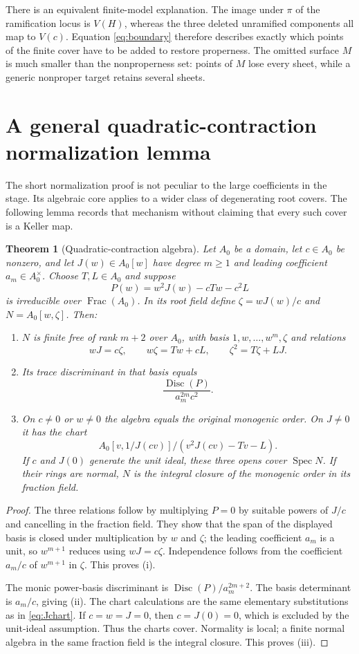 \documentclass[11pt,a4paper]{article}
\newtheorem{theorem}{Theorem}[section]
\theoremstyle{definition}
\newcommand{\Spec}{\operatorname{Spec}}
\newcommand{\Disc}{\operatorname{Disc}}
\begin{document}
There is an equivalent finite-model explanation. The image under $\pi$
of the ramification locus is $V(H)$, whereas the three deleted
unramified components all map to $V(c)$. Equation \eqref{eq:boundary}
therefore describes exactly which points of the finite cover have to be
added to restore properness. The omitted surface $M$ is much smaller
than the nonproperness set: points of $M$ lose every sheet, while a
generic nonproper target retains several sheets.

\section{A general quadratic-contraction normalization lemma}
\label{sec:general}
The short normalization proof is not peculiar to the large coefficients
in the stage. Its algebraic core applies to a wider class of degenerating
root covers. The following lemma records that mechanism without claiming
that every such cover is a Keller map.

\begin{theorem}[Quadratic-contraction algebra]\label{thm:general}
Let $A_0$ be a domain, let $c\in A_0$ be nonzero, and let
$J(w)\in A_0[w]$ have degree $m\ge1$ and leading coefficient
$a_m\in A_0^\times$. Choose $T,L\in A_0$ and suppose
\[
 P(w)=w^2J(w)-cTw-c^2L
\]
is irreducible over $\operatorname{Frac}(A_0)$. In its root field define
$\zeta=wJ(w)/c$ and $N=A_0[w,\zeta]$. Then:
\begin{enumerate}[label=\textup{(\roman*)}]
\item $N$ is finite free of rank $m+2$ over $A_0$, with basis
$1,w,\ldots,w^m,\zeta$ and relations
\[
 wJ=c\zeta,\qquad w\zeta=Tw+cL,\qquad
 \zeta^2=T\zeta+LJ.
\]
\item Its trace discriminant in that basis equals
\[
 \frac{\Disc(P)}{a_m^{2m}c^2}.
\]
\item On $c\ne0$ or $w\ne0$ the algebra equals the original monogenic
order. On $J\ne0$ it has the chart
\[
 A_0[v,1/J(cv)]/(v^2J(cv)-Tv-L).
\]
If $c$ and $J(0)$ generate the unit ideal, these three opens cover
$\Spec N$. If their rings are normal, $N$ is the integral closure of
the monogenic order in its fraction field.
\end{enumerate}
\end{theorem}
\begin{proof}
The three relations follow by multiplying $P=0$ by suitable powers of
$J/c$ and cancelling in the fraction field. They show that the span of
the displayed basis is closed under multiplication by $w$ and $\zeta$;
the leading coefficient $a_m$ is a unit, so $w^{m+1}$ reduces using
$wJ=c\zeta$. Independence follows from the coefficient $a_m/c$ of
$w^{m+1}$ in $\zeta$. This proves (i).

The monic power-basis discriminant is
$\Disc(P)/a_m^{2m+2}$. The basis determinant is $a_m/c$, giving (ii).
The chart calculations are the same elementary substitutions as in
\eqref{eq:Jchart}. If $c=w=J=0$, then $c=J(0)=0$, which is excluded by
the unit-ideal assumption. Thus the charts cover. Normality is local;
a finite normal algebra in the same fraction field is the integral
closure. This proves (iii).
\end{proof}
\end{document}
